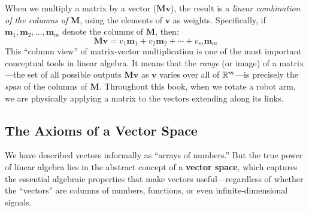 When we multiply a matrix by a vector ($\mathbf{M}\mathbf{v}$), the result is a \emph{linear combination of the columns of} $\mathbf{M}$, using the elements of $\mathbf{v}$ as weights. Specifically, if $\mathbf{m}_1, \mathbf{m}_2, \ldots, \mathbf{m}_m$ denote the columns of $\mathbf{M}$, then:
\begin{equation}
\label{eq:matvec_colview}
   \mathbf{M}\mathbf{v} = v_1 \mathbf{m}_1 + v_2 \mathbf{m}_2 + \cdots + v_m \mathbf{m}_m
\end{equation}
This ``column view'' of matrix-vector multiplication is one of the most important conceptual tools in linear algebra. It means that the \emph{range} (or image) of a matrix---the set of all possible outputs $\mathbf{M}\mathbf{v}$ as $\mathbf{v}$ varies over all of $\mathbb{R}^m$---is precisely the \emph{span} of the columns of $\mathbf{M}$. Throughout this book, when we rotate a robot arm, we are physically applying a matrix to the vectors extending along its links.

\subsection{The Axioms of a Vector Space}
\label{subsec:vector_space_axioms}

We have described vectors informally as ``arrays of numbers.'' But the true power of linear algebra lies in the abstract concept of a \textbf{vector space}, which captures the essential algebraic properties that make vectors useful---regardless of whether the ``vectors'' are columns of numbers, functions, or even infinite-dimensional signals.


